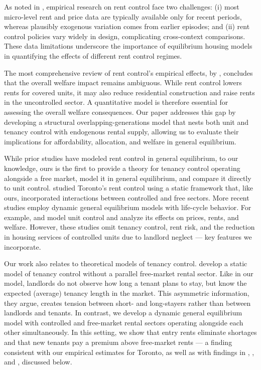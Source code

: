 \documentclass[parskip=full]{article}
\begin{document}
As noted in \citet{mm-2023}, empirical research on rent control face two challenges: (i) most micro-level rent and price data are typically available only for recent periods, whereas plausibly exogenous variation comes from earlier episodes; and (ii) rent control policies vary widely in design, complicating cross-context comparisons. These data limitations underscore the importance of equilibrium housing models in quantifying the effects of different rent control regimes.

The most comprehensive review of rent control’s empirical effects, by \citet{kholodilin-2024}, concludes that the overall welfare impact remains ambiguous. While rent control lowers rents for covered units, it may also reduce residential construction and raise rents in the uncontrolled sector. A quantitative model is therefore essential for assessing the overall welfare consequences. Our paper addresses this gap by developing a structural overlapping-generations model that nests both unit and tenancy control with endogenous rental supply, allowing us to evaluate their implications for affordability, allocation, and welfare in general equilibrium.

While prior studies have modeled rent control in general equilibrium, to our knowledge, ours is the first to provide a theory for tenancy control operating alongside a free market, model it in general equilibrium, and compare it directly to unit control. \citet{fallis-1985} studied Toronto’s rent control using a static framework that, like ours, incorporated interactions between controlled and free sectors. More recent studies employ dynamic general equilibrium models with life-cycle behavior. For example, \citet{eric-1995} and \citet{fmn-2023} model unit control and analyze its effects on prices, rents, and welfare. However, 
these studies omit tenancy control, rent risk, and the reduction in housing services of controlled units due to landlord neglect — key features we incorporate.

Our work also relates to theoretical models of tenancy control. \citet{be-2000} develop a static model of tenancy control without a parallel free-market rental sector. Like in our model, landlords do not observe how long a tenant plans to stay, but know the expected (average) tenancy length in the market. This asymmetric information, they argue, creates tension between short- and long-stayers rather than between landlords and tenants. In contrast, we develop a dynamic general equilibrium model with controlled and free-market rental sectors operating alongside each other simultaneously. In this setting, we show that entry rents eliminate shortages and that new tenants pay a premium above free-market rents — a finding consistent with our empirical estimates for Toronto, as well as with findings in \citet{nagy-1997}, \citet{early-2000}, and \citet{cjq-2023}, discussed below.
\end{document}
